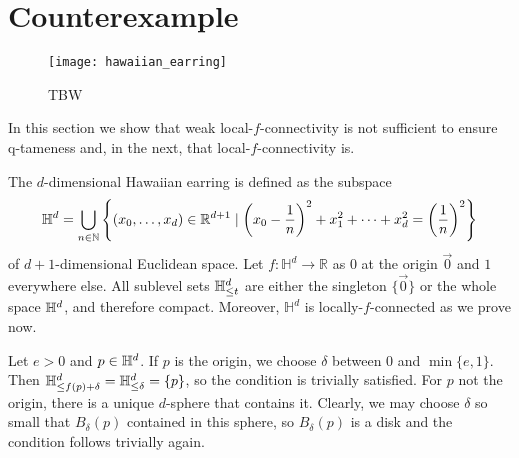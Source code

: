 
\section{Counterexample}

\begin{figure}[t]
	\centering
	\texttt{[image: hawaiian\_earring]}
	\hfill
	\caption{TBW}
	\label{fig:earrings}
\end{figure}

In this section we show that weak local-$f$-connectivity is not sufficient to ensure q-tameness and, in the next, that local-$f$-connectivity is. 

The $d$-dimensional Hawaiian earring is defined as the subspace
\begin{equation*}
\mathbb{H}^d = \bigcup_{n\in\mathbb{N}}\left\{(x_0,\dots,x_d)\in\mathbb{R}^{d+1}\mid \left(x_0-\frac{1}{n}\right)^2+x_1^2+\dots+x_d^2=\left(\frac{1}{n}\right)^2\right\}
\end{equation*}
of $d+1$-dimensional Euclidean space.
Let $f \colon \mathbb{H}^{d}\to\mathbb{R}$ as $0$ at the origin $\vec{0}$ and $1$ everywhere else.
All sublevel sets $\mathbb{H}^d_{\leq t}$ are either the singleton $\{\vec{0}\}$ or the whole space $\mathbb{H}^d$, and therefore compact.
Moreover, $\mathbb{H}^{d}$ is locally-$f$-connected as we prove now. 

Let $e > 0$ and $p \in \mathbb{H}^d$.
If $p$ is the origin, we choose $\delta$ between 0 and $\min\{e,1\}$.
Then $\mathbb{H}^d_{\leq f(p) + \delta} = \mathbb{H}^d_{\leq \delta} = \{p\}$, so the condition is trivially satisfied.
For $p$ not the origin, there is a unique $d$-sphere that contains it.
Clearly, we may choose $\delta$ so small that $B_{\delta}(p)$ contained in this sphere, so $B_{\delta}(p)$ is a disk and the condition follows trivially again. 

